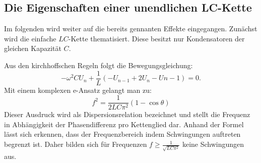 \subsection{Die Eigenschaften einer unendlichen LC-Kette}

Im folgenden wird weiter auf die bereits gennanten Effekte eingegangen. Zunächst
 wird die einfache $LC$-Kette thematisiert. Diese besitzt nur Kondensatoren der
 gleichen Kapazität $C$.

Aus den kirchhoffschen Regeln folgt die Bewegungsgleichung:
\begin{equation}
- \omega ^2 C U_n + \frac{1}{L} \left( -U_{n-1} + 2U_ n -U{n-1} \right) = 0\text{.}
\end{equation}
Mit einem komplexen e-Ansatz gelangt man zu:
\begin{equation}
 f ^2 = \frac{1}{2LC\pi^2}(1-\cos\theta)
\end{equation}
Dieser Ausdruck wird als Dispersionsrelation bezeichnet und stellt die Frequenz in Abhängigkeit
 der Phasendifferenz pro Kettenglied dar. Anhand der Formel lässt sich erkennen,
  dass der Frequenzbereich indem Schwingungen auftreten begrenzt ist. Daher bilden sich
   für Frequenzen $f \geq \frac{1}{\sqrt{LC\pi^2}}$ keine Schwingungen aus.\\\\

